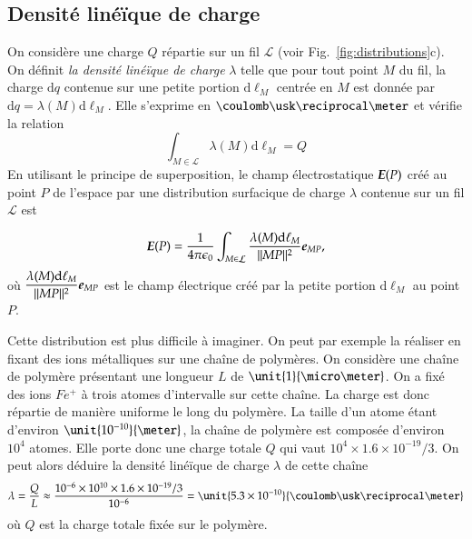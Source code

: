 \subsection{Densité linéïque de charge}
	On considère une charge $Q$ répartie sur un fil $\mathcal{L}$
	(voir Fig.~\ref{fig:distributions}c). 
	On définit \emph{
	la densité linéïque de charge} $\lambda$ 
	telle que pour tout point $M$ du fil,
	la charge $\mathrm{d}q$ contenue sur une petite portion $\mathrm{d}\ell_M$ centrée 
	en $M$ est donnée par $\mathrm{d}q = \lambda(M) \mathrm{d}\ell_M$.
	Elle s'exprime en $\coulomb \usk \reciprocal \meter$ et vérifie la relation
\begin{equation*}
	\int_{M \in \mathcal{L}} \lambda(M) \mathrm{d}\ell_M = Q
\end{equation*}
En utilisant le principe de superposition, le champ électrostatique $\vece(P)$
créé au point $P$ de l'espace par une distribution surfacique de charge $\lambda$
contenue sur un fil $\mathcal{L}$ est

\begin{equation}
	\vece(P) = \pieps \int_{M \in \mathcal{L}} 
	\dfrac{\lambda(M) \mathrm{d}\ell_M}{||MP||^2}\mitbf{e}_{MP},
\end{equation}
où $\dfrac{\lambda(M) \mathrm{d}\ell_M}{||MP||^2}\mitbf{e}_{MP}$ est le champ 
électrique créé par la petite portion $\mathrm{d}\ell_M$ au point $P$.

\begin{exemple}
	Cette distribution est plus difficile à imaginer.
	On peut par exemple la réaliser en fixant des 
	ions métalliques sur une chaîne de polymères. On considère une chaîne de
	polymère présentant une longueur $L$ de $\unit{1}{\micro \meter}$. On a 
	fixé des ions $Fe^+$ à trois atomes d'intervalle sur cette chaîne.
	La charge est donc répartie de manière uniforme le long du polymère.
	La taille d'un atome étant d'environ $\unit{10^{-10}}{\meter}$, la chaîne de 
	polymère est composée d'environ $10^4$ atomes. Elle porte
	donc une charge totale $Q$ qui vaut $10^4 \times 1.6 \times 10^{-19}/3$.
	On peut alors déduire la
	densité linéïque de charge $\lambda$ de cette chaîne
	\begin{equation}
		\lambda = \dfrac{Q}{L} \approx \dfrac{10^{-6}\times 10^{10}
			           \times 1.6 \times 10^{-19}/3}{10^{-6}}
				= \unit{5.3 \times 10^{-10}}{\coulomb \usk
				   \reciprocal \meter}
	\end{equation}
	où $Q$ est la charge totale fixée sur le polymère.
\end{exemple}

